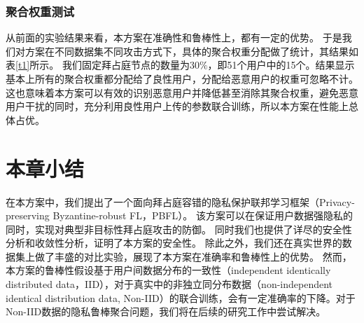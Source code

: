 \subsubsection{聚合权重测试}
从前面的实验结果来看，本方案在准确性和鲁棒性上，都有一定的优势。
于是我们对方案在不同数据集不同攻击方式下，具体的聚合权重分配做了统计，其结果如表\ref{t1}所示。
我们固定拜占庭节点的数量为$30\%$，即51个用户中的15个。结果显示基本上所有的聚合权重都分配给了良性用户，分配给恶意用户的权重可忽略不计。
这也意味着本方案可以有效的识别恶意用户并降低甚至消除其聚合权重，避免恶意用户干扰的同时，充分利用良性用户上传的参数联合训练，所以本方案在性能上总体占优。

\begin{table}[htbp]
	\begin{center}
		\caption{Aggregation Weights in PBFL}
		\label{t1}
		\end{center}
	\end{table}

\section{本章小结}\label{con}
在本方案中，我们提出了一个面向拜占庭容错的隐私保护联邦学习框架（Privacy-preserving Byzantine-robust FL，PBFL）。
该方案可以在保证用户数据强隐私的同时，实现对典型非目标性拜占庭攻击的防御。
同时我们也提供了详尽的安全性分析和收敛性分析，证明了本方案的安全性。
除此之外，我们还在真实世界的数据集上做了丰盛的对比实验，展现了本方案在准确率和鲁棒性上的优势。
然而，本方案的鲁棒性假设基于用户间数据分布的一致性（independent identically distributed data，IID），对于真实中的非独立同分布数据（non-independent identical distribution data, Non-IID）的联合训练，会有一定准确率的下降。对于Non-IID数据的隐私鲁棒聚合问题，我们将在后续的研究工作中尝试解决。